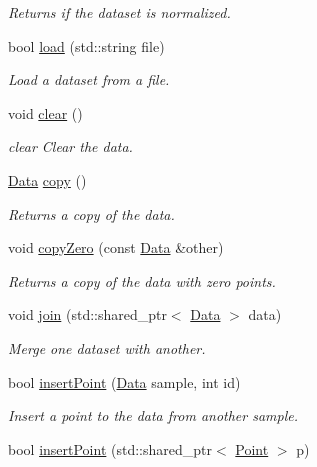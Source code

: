\begin{DoxyCompactItemize}
\begin{DoxyCompactList}\small\item\em Returns if the dataset is normalized. \end{DoxyCompactList}\item 
bool \hyperlink{class_data_ac2ed251251be234c607f486e16902112}{load} (std\+::string file)
\begin{DoxyCompactList}\small\item\em Load a dataset from a file. \end{DoxyCompactList}\item 
\mbox{\label{class_data_a44b749f64ffa35e034f9503fdec4917e}} 
void \hyperlink{class_data_a44b749f64ffa35e034f9503fdec4917e}{clear} ()
\begin{DoxyCompactList}\small\item\em clear Clear the data. \end{DoxyCompactList}\item 
\hyperlink{class_data}{Data} \hyperlink{class_data_afb7687021aa7d5f1ecae464eee601710}{copy} ()
\begin{DoxyCompactList}\small\item\em Returns a copy of the data. \end{DoxyCompactList}\item 
void \hyperlink{class_data_a6454e835f570d10e7614ac237d6fdf79}{copy\+Zero} (const \hyperlink{class_data}{Data} \&other)
\begin{DoxyCompactList}\small\item\em Returns a copy of the data with zero points. \end{DoxyCompactList}\item 
void \hyperlink{class_data_a89252c083e4dde3ea403e27604db53ea}{join} (std\+::shared\+\_\+ptr$<$ \hyperlink{class_data}{Data} $>$ data)
\begin{DoxyCompactList}\small\item\em Merge one dataset with another. \end{DoxyCompactList}\item 
bool \hyperlink{class_data_abb6aade47d78a284301c32e82b2cbee2}{insert\+Point} (\hyperlink{class_data}{Data} sample, int id)
\begin{DoxyCompactList}\small\item\em Insert a point to the data from another sample. \end{DoxyCompactList}\item 
bool \hyperlink{class_data_a4dcec7d15085d451cf46a0459fab9f46}{insert\+Point} (std\+::shared\+\_\+ptr$<$ \hyperlink{class_point}{Point} $>$ p)

\end{DoxyCompactItemize}
